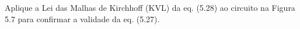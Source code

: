 Aplique a Lei das Malhas de Kirchhoff (KVL) da eq. (5.28) ao circuito na Figura 5.7 para confirmar a validade da eq. (5.27).
